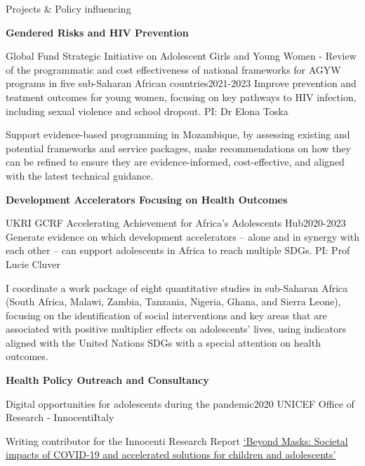 \begin{rSection}{Projects \& Policy influencing}
\begin{etaremune}
\vspace{1em}

\item \textbf{Gendered Risks and HIV Prevention}

\begin{rSubsection}
{Global Fund Strategic Initiative on Adolescent Girls and Young Women - Review of the programmatic and cost effectiveness of national frameworks for AGYW programs in five sub-Saharan African countries}{2021-2023}
{Improve prevention and teatment outcomes for young women, focusing on key pathways to HIV infection, including sexual violence and school dropout. PI: Dr Elona Toska}\par
{Support evidence-based programming in Mozambique, by assessing existing and potential frameworks and service packages, make recommendations on how they can be refined to ensure they are evidence-informed, cost-effective, and aligned with the latest technical guidance.}
\end{rSubsection}

\vspace{1em}

\item \textbf{Development Accelerators Focusing on Health Outcomes}\par

\begin{rSubsection}
{UKRI GCRF Accelerating Achievement for Africa's Adolescents Hub}{2020-2023}
{Generate evidence on which development accelerators – alone and in synergy with each other – can support adolescents in Africa to reach multiple SDGs. PI: Prof Lucie Cluver}\par
{I coordinate a work package of eight quantitative studies in sub-Saharan Africa (South Africa, Malawi, Zambia, Tanzania, Nigeria, Ghana, and Sierra Leone), focusing on the identification of social interventions and key areas that are associated with positive multiplier effects on adolescents’ lives, using indicators aligned with the United Nations SDGs with a special attention on health outcomes.} 
\end{rSubsection}

\vspace{1em}

\item  \textbf{Health Policy Outreach and Consultancy}\par

\begin{rSubsection}
{Digital opportunities for adolescents during the pandemic}{2020}
{UNICEF Office of Research - Innocenti}{Italy}\par
{Writing contributor for the Innocenti Research Report \href{https://www.unicef-irc.org/publications/pdf/UNICEF-Beyond-Masks-Report-Societal-impacts-of-COVID-19.pdf}{‘Beyond Masks: Societal impacts of COVID-19 and accelerated solutions for children and adolescents'}}
\end{rSubsection}


\end{etaremune}
\end{rSection}
